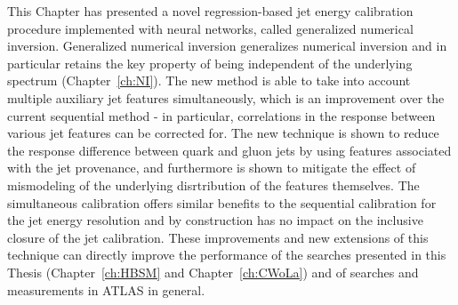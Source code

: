 
This Chapter has presented a novel regression-based jet energy calibration procedure implemented with neural networks, called generalized numerical inversion.
Generalized numerical inversion generalizes numerical inversion and in particular retains the key property of being independent of the underlying spectrum (Chapter~\ref{ch:NI}).
The new method is able to take into account multiple auxiliary jet features simultaneously, which is an improvement over the current sequential method - in particular, correlations in the response between various jet features can be corrected for.
The new technique is shown to reduce the response difference between quark and gluon jets by using features associated with the jet provenance, and furthermore is shown to mitigate the effect of mismodeling of the underlying disrtribution of the features themselves.
The simultaneous calibration offers similar benefits to the sequential calibration for the jet energy resolution and by construction has no impact on the inclusive closure of the jet calibration.
These improvements and new extensions of this technique can directly improve the performance of the searches presented in this Thesis (Chapter~\ref{ch:HBSM} and Chapter~\ref{ch:CWoLa}) and of searches and measurements in ATLAS in general.
